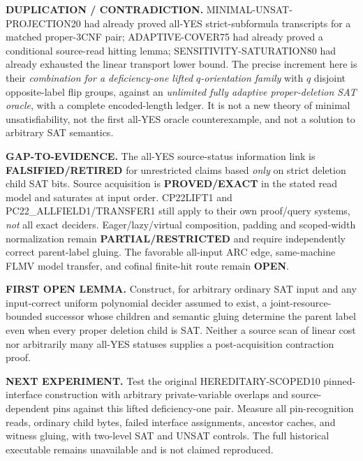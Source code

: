 \documentclass[11pt]{article}
\newcommand{\OPEN}{\textbf{OPEN}}
\begin{document}
\par\noindent\textbf{DUPLICATION / CONTRADICTION.} MINIMAL-UNSAT-PROJECTION20 had already proved all-YES strict-subformula transcripts for a matched proper-3CNF pair; ADAPTIVE-COVER75 had already proved a conditional source-read hitting lemma; SENSITIVITY-SATURATION80 had already exhausted the linear transport lower bound. The precise increment here is their \emph{combination for a deficiency-one lifted \(q\)-orientation family} with \(q\) disjoint opposite-label flip groups, against an \emph{unlimited fully adaptive proper-deletion SAT oracle}, with a complete encoded-length ledger. It is not a new theory of minimal unsatisfiability, not the first all-YES oracle counterexample, and not a solution to arbitrary SAT semantics.

\par\noindent\textbf{GAP-TO-EVIDENCE.} The all-YES source-status information link is \textbf{FALSIFIED/RETIRED} for unrestricted claims based \emph{only} on strict deletion child SAT bits. Source acquisition is \textbf{PROVED/EXACT} in the stated read model and saturates at input order. CP22LIFT1 and PC22_ALLFIELD1/TRANSFER1 still apply to their own proof/query systems, \emph{not} all exact deciders. Eager/lazy/virtual composition, padding and scoped-width normalization remain \textbf{PARTIAL/RESTRICTED} and require independently correct parent-label gluing. The favorable all-input ARC edge, same-machine FLMV model transfer, and cofinal finite-hit route remain \OPEN.

\par\noindent\textbf{FIRST OPEN LEMMA.} Construct, for arbitrary ordinary SAT input and any input-correct uniform polynomial decider assumed to exist, a joint-resource-bounded successor whose children and semantic gluing determine the parent label even when every proper deletion child is SAT. Neither a source scan of linear cost nor arbitrarily many all-YES statuses supplies a post-acquisition contraction proof.

\par\noindent\textbf{NEXT EXPERIMENT.} Test the original HEREDITARY-SCOPED10 pinned-interface construction with arbitrary private-variable overlaps and source-dependent pins against this lifted deficiency-one pair. Measure all pin-recognition reads, ordinary child bytes, failed interface assignments, ancestor caches, and witness gluing, with two-level SAT and UNSAT controls. The full historical executable remains unavailable and is not claimed reproduced.
\end{document}
